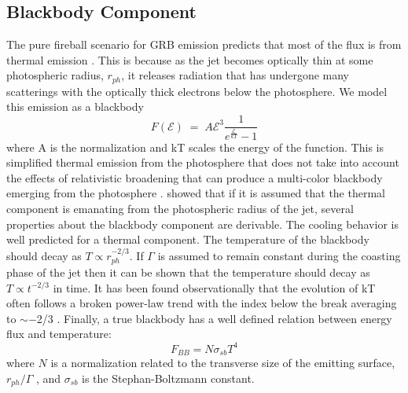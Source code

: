 \subsection{Blackbody Component}
\label{sec:model:bb}
The pure fireball scenario for GRB emission predicts that most of the
flux is from thermal emission
\cite{Goodman:1986,Paczynski:1986}. This is because as the jet
becomes optically thin at some photospheric radius, $r_{ph}$, it
releases radiation that has undergone many scatterings with the
optically thick electrons below the photosphere. We model this
emission as a blackbody
\begin{equation}
  \label{eq:blackbody}
  F(\mathcal{E})\;=\;A \mathcal{E}^3 \frac{1}{ e^{\frac{\mathcal{E}}{kT}}-1}
\end{equation}
where A is the normalization and kT scales the energy of the
function. This is simplified thermal emission from the photosphere
that does not take into account the effects of relativistic broadening
that can produce a multi-color blackbody emerging from the photosphere
\cite{Beloborodov:2010,Ryde:2010,Peer:2011}. \cite{Ryde:2006} showed
that if it is assumed that the thermal component is emanating from the
photospheric radius of the jet, several properties about the blackbody
component are derivable. The cooling behavior is well predicted for a
thermal component. The temperature of the blackbody should decay as
$T\propto r_{ph}^{-2/3}$. If $\Gamma$ is assumed to remain constant
during the coasting phase of the jet then it can be shown that the
temperature should decay as $T \propto t^{-2/3}$ in time.  It has been
found observationally that the evolution of kT often follows a broken
power-law trend with the index below the break averaging to $\sim
-$2/3 \cite{Ryde:2009}. Finally, a true blackbody has a well defined
relation between energy flux and temperature:
\begin{equation}
   \label{eq:sbl}
  F_{BB}=N\sigma_{sb} T^4
\end{equation}
where $N$ is a normalization related to the transverse size of the
emitting surface, $r_{ph}/\Gamma$
\cite{Ryde:2005,Ryde:2009,Iyyani:2013}, and $\sigma_{sb}$ is the
Stephan-Boltzmann constant.


